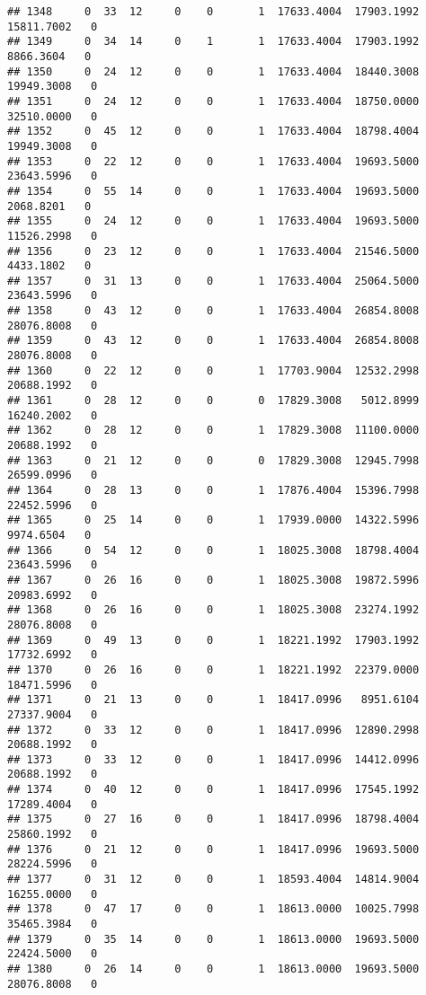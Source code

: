 \documentclass[
]{article}
\begin{document}
\begin{enumerate}
\begin{verbatim}
## 1348     0  33  12     0    0       1  17633.4004  17903.1992  15811.7002   0
## 1349     0  34  14     0    1       1  17633.4004  17903.1992   8866.3604   0
## 1350     0  24  12     0    0       1  17633.4004  18440.3008  19949.3008   0
## 1351     0  24  12     0    0       1  17633.4004  18750.0000  32510.0000   0
## 1352     0  45  12     0    0       1  17633.4004  18798.4004  19949.3008   0
## 1353     0  22  12     0    0       1  17633.4004  19693.5000  23643.5996   0
## 1354     0  55  14     0    0       1  17633.4004  19693.5000   2068.8201   0
## 1355     0  24  12     0    0       1  17633.4004  19693.5000  11526.2998   0
## 1356     0  23  12     0    0       1  17633.4004  21546.5000   4433.1802   0
## 1357     0  31  13     0    0       1  17633.4004  25064.5000  23643.5996   0
## 1358     0  43  12     0    0       1  17633.4004  26854.8008  28076.8008   0
## 1359     0  43  12     0    0       1  17633.4004  26854.8008  28076.8008   0
## 1360     0  22  12     0    0       1  17703.9004  12532.2998  20688.1992   0
## 1361     0  28  12     0    0       0  17829.3008   5012.8999  16240.2002   0
## 1362     0  28  12     0    0       1  17829.3008  11100.0000  20688.1992   0
## 1363     0  21  12     0    0       0  17829.3008  12945.7998  26599.0996   0
## 1364     0  28  13     0    0       1  17876.4004  15396.7998  22452.5996   0
## 1365     0  25  14     0    0       1  17939.0000  14322.5996   9974.6504   0
## 1366     0  54  12     0    0       1  18025.3008  18798.4004  23643.5996   0
## 1367     0  26  16     0    0       1  18025.3008  19872.5996  20983.6992   0
## 1368     0  26  16     0    0       1  18025.3008  23274.1992  28076.8008   0
## 1369     0  49  13     0    0       1  18221.1992  17903.1992  17732.6992   0
## 1370     0  26  16     0    0       1  18221.1992  22379.0000  18471.5996   0
## 1371     0  21  13     0    0       1  18417.0996   8951.6104  27337.9004   0
## 1372     0  33  12     0    0       1  18417.0996  12890.2998  20688.1992   0
## 1373     0  33  12     0    0       1  18417.0996  14412.0996  20688.1992   0
## 1374     0  40  12     0    0       1  18417.0996  17545.1992  17289.4004   0
## 1375     0  27  16     0    0       1  18417.0996  18798.4004  25860.1992   0
## 1376     0  21  12     0    0       1  18417.0996  19693.5000  28224.5996   0
## 1377     0  31  12     0    0       1  18593.4004  14814.9004  16255.0000   0
## 1378     0  47  17     0    0       1  18613.0000  10025.7998  35465.3984   0
## 1379     0  35  14     0    0       1  18613.0000  19693.5000  22424.5000   0
## 1380     0  26  14     0    0       1  18613.0000  19693.5000  28076.8008   0

\end{verbatim}
\end{enumerate}
\end{document}
